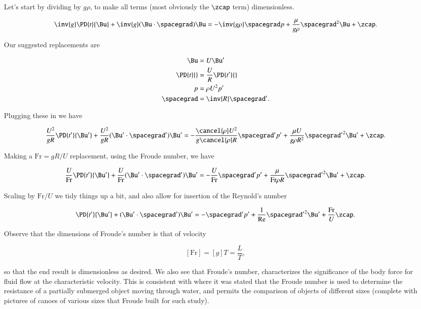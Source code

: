 \begin{Answer}[ref={problem:fluids:ps3:q2}]
Let's start by dividing by $g \rho$, to make all terms (most obviously the $\zcap$ term) dimensionless.

\begin{equation}\label{eqn:continuumProblemSet3:250}
\inv{g} \PD{t}{\Bu} + \inv{g} (\Bu \cdot \spacegrad) \Bu = - \inv{g \rho} \spacegrad p + \frac{\mu}{g \rho} \spacegrad^2 \Bu + \zcap.
\end{equation}

Our suggested replacements are

\begin{align}\label{eqn:continuumProblemSet3:270}
\Bu &= U \Bu' \\
\PD{t}{} &= \frac{U}{R} \PD{t'}{} \\
p &= \rho U^2 p' \\
\spacegrad &= \inv{R} \spacegrad'.
\end{align}

Plugging these in we have

\begin{equation}\label{eqn:continuumProblemSet3:290}
\frac{U^2}{g R} \PD{t'}{\Bu'} + \frac{U^2}{g R} (\Bu' \cdot \spacegrad') \Bu' = - \frac{\cancel{\rho} U^2}{g \cancel{\rho} R} \spacegrad' p' + \frac{\mu U}{g \rho R^2} {\spacegrad'}^2 \Bu' + \zcap.
\end{equation}

Making a $\text{Fr} = gR/U$ replacement, using the Froude number, we have

\begin{equation}\label{eqn:continuumProblemSet3:310}
\frac{U}{\text{Fr}} \PD{t'}{\Bu'} + \frac{U}{\text{Fr}} (\Bu' \cdot \spacegrad') \Bu' = - \frac{U}{\text{Fr}} \spacegrad' p' + \frac{\mu }{\text{Fr} \rho R} {\spacegrad'}^2 \Bu' + \zcap.
\end{equation}

Scaling by $\text{Fr}/U$ we tidy things up a bit, and also allow for insertion of the Reynold's number

\begin{equation}\label{eqn:continuumProblemSet3:330}
\PD{t'}{\Bu'} + (\Bu' \cdot \spacegrad') \Bu' = - \spacegrad' p' + \frac{1}{\text{Re}} {\spacegrad'}^2 \Bu' + \frac{\text{Fr}}{U}\zcap.
\end{equation}

Observe that the dimensions of Froude's number is that of velocity

\begin{equation}\label{eqn:continuumProblemSet3:350}
[\text{Fr}] = [g] T = \frac{L}{T},
\end{equation}

so that the end result is dimensionless as desired.  We also see that Froude's number, characterizes the significance of the body force for fluid flow at the characteristic velocity.  This is consistent with \citep{wiki:froudeNumber} where it was stated that the Froude number is used to determine the resistance of a partially submerged object moving through water, and permits the comparison of objects of different sizes (complete with pictures of canoes of various sizes that Froude built for such study).
\end{Answer}
